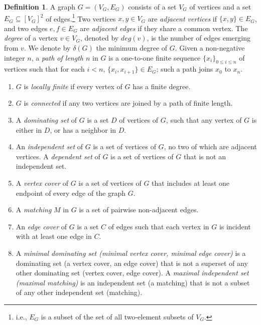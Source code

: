 \documentclass[12pt,reqno,a4paper]{amsart}
\theoremstyle{definition}
\newtheorem{defn}{Definition}[section]
\begin{document}
	\begin{defn}
		A graph $G=(V_{G}, E_{G})$ consists of a set $V_{G}$ of vertices and a set $E_{G}\subseteq [V_{G}]^{2}$ of edges.\footnote{i.e., $E_{G}$ is a subset of the set of all two-element subsets of $V_{G}$.} Two vertices $x, y \in V_{G}$ are {\em adjacent vertices} if $\{x, y\} \in E_{G}$, and two edges $e,f\in E_{G}$ are {\em adjacent edges} if they share a common vertex. 
		The {\em degree} of a vertex $v\in V_{G}$, denoted by $deg(v)$, is the number of edges emerging from $v$. We denote by $\delta(G)$ the minimum degree of $G$. Given a non-negative integer $n$, a {\em path of length $n$} in $G$ is a one-to-one finite sequence $\{x_{i}\}_{0\leq i \leq n}$ of vertices such that for each $i < n$, $\{x_{i}, x_{i+1}\} \in E_{G}$; such a path joins $x_{0}$ to $x_{n}$. 
		\begin{enumerate}
			\item $G$ is {\em locally finite} if every vertex of $G$ has a finite degree.
			\item $G$ is {\em connected} if any two vertices are joined by a path of finite length.
			\item A {\em dominating set} of $G$ is a set $D$ of vertices of $G$, such that any vertex of $G$ is either in $D$, or has a neighbor in $D$. 
			
			\item An {\em independent set} of $G$
			is a set of vertices of $G$, no two of which are adjacent vertices. A {\em dependent set} of $G$ is a set of vertices of $G$ that is not an independent set.
			
			\item  A {\em vertex cover} of $G$ is a set of vertices of $G$ that includes at least one endpoint of every edge of the graph $G$.
			
			\item A {\em matching} $M$ in $G$ is a set of pairwise non-adjacent edges. 
			
			\item An {\em edge cover} of $G$ is a set $C$ of edges such that each vertex in $G$ is incident with at least one edge in $C$.
			
			\item   A {\em minimal dominating set (minimal vertex cover, minimal edge cover)} is a dominating set (a vertex cover, an edge cover) that is not a superset of any other dominating set (vertex cover, edge cover).  A {\em maximal independent set (maximal matching)} is an independent set (a matching) that is not a subset of any other independent set (matching).
			

\end{enumerate}
\end{defn}
\end{document}
